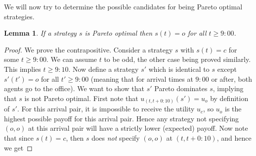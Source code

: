 \documentclass[twocolumn,a4paper,superscriptaddress,nofootinbib]{revtex4}
\newtheorem{lemma}[theorem]{Lemma}
\begin{document}
We will now try to determine the possible candidates for being Pareto optimal strategies. %
\begin{lemma}\label{lemma:no-canteen-at-nine}
If a strategy $s$ is Pareto optimal then $s(t) =o$ for all $t \geq 9{:}00$.
\end{lemma}
\begin{proof}
We prove the contrapositive. Consider a strategy $s$ with $s(t) = c$ for some $t \geq 9{:}00$. We can assume $t$ to be odd, the other case being proved similarly. This implies $t \geq 9{:}10$.
Now define a strategy $s'$ which is identical to $s$ except $s'(t') = o$ for all $t' \geq 9{:}00$ (meaning that for arrival times at $9{:}00$ or after, both agents go to the office).  We want to show that $s'$ Pareto dominates $s$, implying that $s$ is not Pareto optimal. First note that
 $u_{(t,t+0{:}10)}(s') = u_o$
 by definition of $s'$.
For this arrival pair, it is impossible to receive the utility $u_c$, so $u_o$ is the highest possible payoff for this arrival pair. 
Hence any strategy not specifying $(o,o)$ at this arrival pair 
will have a strictly lower (expected) payoff. Now note that since $s(t) = c$, then $s$ does \emph{not} specify $(o,o)$ at $(t,t+0{:}10)$, and hence we get 

\end{proof}
\end{document}
